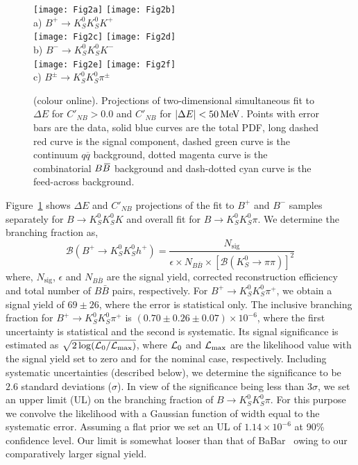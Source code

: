 \documentclass[aps,prl,preprint,tightenlines,superscriptaddress,,amsmath,byrevtex]{revtex4}
\def\qqbar  {\ensuremath{q\overline q}\xspace}
\def\KS     {\ensuremath{K^0_{\scriptscriptstyle S}}\xspace}
\def\Bbar   {\kern 0.18em\overline{\kern -0.18em B}{}\xspace}
\def\BB     {\ensuremath{B\Bbar}\xspace}
\def\DeltaE {\mbox{$\Delta E$}\xspace}
\def\to{\ensuremath{\rightarrow}\xspace}
\def\nbprim{\ensuremath{C'_{N\!B}}\xspace}
\newcommand{\mev}{\ensuremath{\mathrm{\,Me\kern -0.1em V}}\xspace}
\begin{document}
\begin{figure}
\texttt{[image: Fig2a]}
\texttt{[image: Fig2b]}\\
a) $B^{+}\to\KS\KS K^{+}$ \\
\vspace{0.03 in}
\texttt{[image: Fig2c]}
\texttt{[image: Fig2d]}\\
 b) $B^{-}\to\KS\KS K^{-}$ \\
 \vspace{0.03 in}
\texttt{[image: Fig2e]}
\texttt{[image: Fig2f]}\\
\vspace{0.03 in}
 c) $B^{\pm}\to\KS\KS \pi^{\pm}$ \\
\caption{(colour online). Projections of two-dimensional simultaneous fit to $\DeltaE$ for $\nbprim>0.0$ and $\nbprim$ for $|\DeltaE|<50\mev$. Points with error bars are the data, solid blue curves are the total PDF, long dashed red curve is the signal component, dashed green curve is the continuum $\qqbar$ background, dotted magenta curve is the combinatorial $\BB$ background and dash-dotted cyan curve is the feed-across background.}
\label{fig:2D}
\end{figure}
Figure~\ref{fig:2D} shows $\DeltaE$ and $\nbprim$ projections of the fit to $B^{+}$ and $B^{-}$ samples separately for $B\to K^0_SK^0_S K$ and overall fit for $B\to K^0_SK^0_S\pi$.  We determine the branching fraction as,
\begin{equation}
 \mathcal{B}(B^{+} \rightarrow K_{S}^{0} K_{S}^{0} h^{+}) = \dfrac{N_{\mathrm{sig}}}{\epsilon  \times N_{B\bar{B}} \times [\mathcal{B}(K^{0}_{S} \rightarrow \pi \pi)]^{2}  }  
 \end{equation}
 where, $N_{\mathrm{sig}}$, $\epsilon$ and $N_{B \bar{B}}$ are the signal yield, corrected reconstruction efficiency and total number of $B \bar{B}$ pairs, respectively. For $B^{+}\to\KS\KS\pi^{+}$, we obtain a signal yield of $69\pm 26$, where the error is statistical only. The inclusive branching fraction for $B^{+}\to\KS\KS\pi^{+}$  is $(0.70 \pm 0.26 \pm 0.07)\times 10^{-6}$, where the first uncertainty is statistical and the second is systematic. Its signal significance is estimated as $\sqrt{2\log({\cal L}_0/{\cal L}_{\rm max})}$, where ${\cal L}_0$ and ${\cal L}_{\rm max}$ are the likelihood value with the signal yield set to zero and for the nominal case, respectively. Including systematic uncertainties (described below), we determine the significance to be $2.6$ standard deviations ($\sigma$). In view of the significance being less than 3$\sigma$, we set an upper limit (UL) on the branching fraction of $B\to K^0_SK^0_S\pi$. For this purpose we convolve the likelihood with a Gaussian function of width equal to the systematic error. Assuming a flat prior we set an UL of $1.14 \times 10^{-6}$ at 90\% confidence level. Our limit is somewhat looser than that of BaBar~\cite{BaBar:paper2} owing to our comparatively larger signal yield.
 
\end{document}
